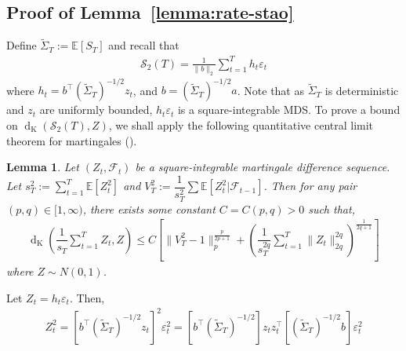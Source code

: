 \documentclass[11pt,letterpaper]{article}
\newcommand{\Exs}{\mathbb{E}}
\newcommand{\z}{z}
\newcommand{\dist}{\operatorname{d}_{\operatorname{K}}}
\newcommand{\PT}{\tilde{\Sigma}_T}
\newcommand{\stato}{\mathcal{S}_2(T)}
\theoremstyle{plain}
\newtheorem{lemma}{Lemma}
\theoremstyle{definition}  %
\begin{document}
\subsection*{Proof of Lemma~\ref{lemma:rate-stao}}



\noindent Define $\PT := \Exs[S_T]$ and recall that
\begin{align*}
    \stato
    = \frac{1}{ \|b \|_2} \sum^T_{t=1} h_t  \varepsilon_t
\end{align*}
where $h_t = b^{\top} (\PT)^{-1/2} \z_t$, and $b = (\PT)^{-1/2}a$. Note that as $\PT$ is deterministic and $\z_t$ are uniformly bounded, $ h_t\varepsilon_t$ is a square-integrable MDS. To prove a bound on $\dist(\stato,Z)$, we shall apply the following quantitative central limit theorem for martingales (\citet{mourrat2013rate}).

\begin{lemma}\label{lemma:mart-clt}
Let $(Z_t,\mathcal{F}_t)$ be a square-integrable martingale difference sequence. Let $s^2_T:= \sum^T_{t=1} \Exs[Z^2_t]$ and $V^2_T := \dfrac{1}{s^2_T} \sum \Exs[Z^2_t|\mathcal{F}_{t-1}]$. Then for any pair $(p,q) \in [1,\infty)$, there exists some constant $C = C(p,q)>0$ such that,
\begin{align}
    \dist \left(\dfrac{1}{s_T}\sum^T_{t=1}Z_t,Z \right)
    \leq C \left[ \|V^2_T-1 \|^{\frac{p}{2p+1}}_p + \left(\dfrac{1}{s^{2q}_T}\sum^T_{t=1} \| Z_t\|^{2q}_{2q} \right)^{\frac{1}{2q+1}}  \right]
\end{align}
where $Z \sim N(0,1)$. 
\end{lemma}



\noindent Let $Z_t = h_t\varepsilon_t$. Then,
\begin{align*}
    Z^2_t 
    =  [b^{\top} \left(\PT \right)^{-1/2} \z_t]^2 \varepsilon^2_t
    =  \left[b^{\top} \left(\PT \right)^{-1/2} \right] \z_t \z_t^{\top} \left[ \left(\PT \right)^{-1/2} b\right]\varepsilon^2_t
\end{align*}
\end{document}
